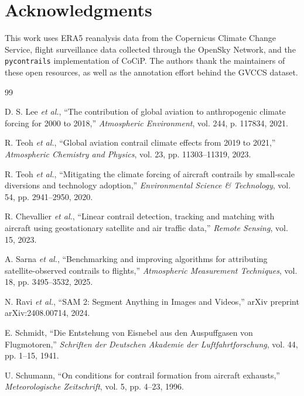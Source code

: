 \documentclass[1p,11pt]{elsarticle}
\begin{document}
\section*{Acknowledgments}

This work uses ERA5 reanalysis data from the Copernicus Climate Change Service, flight surveillance data collected through the OpenSky Network, and the \texttt{pycontrails} implementation of CoCiP. The authors thank the maintainers of these open resources, as well as the annotation effort behind the GVCCS dataset.


\begin{thebibliography}{99}

D. S. Lee \textit{et al.}, ``The contribution of global aviation to anthropogenic climate forcing for 2000 to 2018,'' \textit{Atmospheric Environment}, vol. 244, p. 117834, 2021.

R. Teoh \textit{et al.}, ``Global aviation contrail climate effects from 2019 to 2021,'' \textit{Atmospheric Chemistry and Physics}, vol. 23, pp. 11303--11319, 2023.

R. Teoh \textit{et al.}, ``Mitigating the climate forcing of aircraft contrails by small-scale diversions and technology adoption,'' \textit{Environmental Science \& Technology}, vol. 54, pp. 2941--2950, 2020.

R. Chevallier \textit{et al.}, ``Linear contrail detection, tracking and matching with aircraft using geostationary satellite and air traffic data,'' \textit{Remote Sensing}, vol. 15, 2023.

A. Sarna \textit{et al.}, ``Benchmarking and improving algorithms for attributing satellite-observed contrails to flights,'' \textit{Atmospheric Measurement Techniques}, vol. 18, pp. 3495--3532, 2025.

N. Ravi \textit{et al.}, ``SAM 2: Segment Anything in Images and Videos,'' arXiv preprint arXiv:2408.00714, 2024.

E. Schmidt, ``Die Entstehung von Eisnebel aus den Auspuffgasen von Flugmotoren,'' \textit{Schriften der Deutschen Akademie der Luftfahrtforschung}, vol. 44, pp. 1--15, 1941.

U. Schumann, ``On conditions for contrail formation from aircraft exhausts,'' \textit{Meteorologische Zeitschrift}, vol. 5, pp. 4--23, 1996.


\end{thebibliography}
\end{document}
